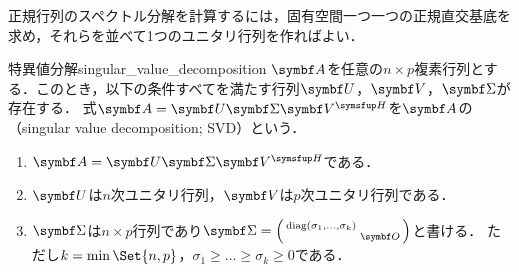 \documentclass[../../main]{subfiles}
\begin{document}
\begin{note}
  正規行列のスペクトル分解を計算するには，固有空間一つ一つの正規直交基底を求め，それらを並べて1つのユニタリ行列を作ればよい．
\end{note}

\begin{corollary}{特異値分解}{singular_value_decomposition}
  \(\mat{A}\)を任意の\(n\times p\)複素行列とする．このとき，以下の条件すべてを満たす行列\(\mat{U}\)，\(\mat{V}\)，\(\mat{\Sigma}\)が存在する．
  式\(\mat{A}=\mat{U}\mat{\Sigma}\htrps{\mat{V}}\)を\(\mat{A}\)の（singular value decomposition; SVD）という．
  \begin{enumerate}
    \item \(\mat{A}=\mat{U}\mat{\Sigma}\htrps{\mat{V}}\)である．
    \item \(\mat{U}\)は\(n\)次ユニタリ行列，\(\mat{V}\)は\(p\)次ユニタリ行列である．
    \item \(\mat{\Sigma}\)は\(n\times p\)行列であり\(\mat{\Sigma}=\smallmatrice{\diag(\sigma_1,\dots,\sigma_k) & \\ & \zmat}\)と書ける．
      ただし\(k=\min\Set{n,p}\)，\(\sigma_1\geq\dots\geq\sigma_k\geq 0\)である．
  \end{enumerate}
\end{corollary}
\end{document}
